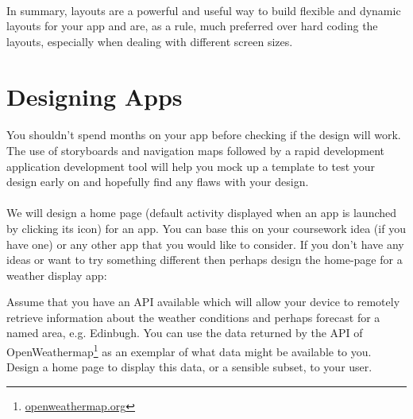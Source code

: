 \paragraph{} In summary, layouts are a powerful and useful way to build flexible and dynamic layouts for your app and are, as a rule, much preferred over hard coding the layouts, especially when dealing with different screen sizes.




\section{Designing Apps}
\paragraph{} You shouldn’t spend months on your app before checking if the design will work. The use of storyboards and navigation maps followed by a rapid development application development tool will help you mock up a template to test your design early on and hopefully find any flaws with your design.

\paragraph{} We will design a home page (default activity displayed when an app is launched by clicking its icon) for an app. You can base this on your coursework idea (if you have one) or any other app that you would like to consider. If you don't have any ideas or want to try something different then perhaps design the home-page for a weather display app:

\begin{framed}
Assume that you have an API available which will allow your device to remotely retrieve information about the weather conditions and perhaps forecast for a named area, e.g. Edinbugh. You can use the data returned by the API of OpenWeathermap\footnote{\url{openweathermap.org}} as an exemplar of what data might be available to you. Design a home page to display this data, or a sensible subset, to your user.
\end{framed}

